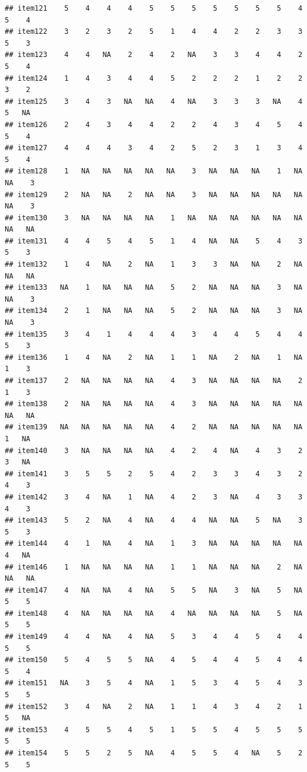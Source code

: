 \documentclass[
  man]{apa6}
\begin{document}
\begin{verbatim}
## item121    5    4    4    4    5    5    5    5    5    5    5    4    5    4
## item122    3    2    3    2    5    1    4    4    2    2    3    3    5    3
## item123    4    4   NA    2    4    2   NA    3    3    4    4    2    5    4
## item124    1    4    3    4    4    5    2    2    2    1    2    2    3    2
## item125    3    4    3   NA   NA    4   NA    3    3    3   NA    4    5   NA
## item126    2    4    3    4    4    2    2    4    3    4    5    4    5    4
## item127    4    4    4    3    4    2    5    2    3    1    3    4    5    4
## item128    1   NA   NA   NA   NA   NA    3   NA   NA   NA    1   NA   NA    3
## item129    2   NA   NA    2   NA   NA    3   NA   NA   NA   NA   NA   NA    3
## item130    3   NA   NA   NA   NA    1   NA   NA   NA   NA   NA   NA   NA   NA
## item131    4    4    5    4    5    1    4   NA   NA    5    4    3    5    3
## item132    1    4   NA    2   NA    1    3    3   NA   NA    2   NA   NA   NA
## item133   NA    1   NA   NA   NA    5    2   NA   NA   NA    3   NA   NA    3
## item134    2    1   NA   NA   NA    5    2   NA   NA   NA    3   NA   NA    3
## item135    3    4    1    4    4    4    3    4    4    5    4    4    5    3
## item136    1    4   NA    2   NA    1    1   NA    2   NA    1   NA    1    3
## item137    2   NA   NA   NA   NA    4    3   NA   NA   NA   NA    2    1    3
## item138    2   NA   NA   NA   NA    4    3   NA   NA   NA   NA   NA   NA   NA
## item139   NA   NA   NA   NA   NA    4    2   NA   NA   NA   NA   NA    1   NA
## item140    3   NA   NA   NA   NA    4    2    4   NA    4    3    2    3   NA
## item141    3    5    5    2    5    4    2    3    3    4    3    2    4    3
## item142    3    4   NA    1   NA    4    2    3   NA    4    3    3    4    3
## item143    5    2   NA    4   NA    4    4   NA   NA    5   NA    3    5    3
## item144    4    1   NA    4   NA    1    3   NA   NA   NA   NA   NA    4   NA
## item146    1   NA   NA   NA   NA    1    1   NA   NA   NA    2   NA   NA   NA
## item147    4   NA   NA    4   NA    5    5   NA    3   NA    5   NA    5    5
## item148    4   NA   NA   NA   NA    4   NA   NA   NA   NA    5   NA    5    5
## item149    4    4   NA    4   NA    5    3    4    4    5    4    4    5    5
## item150    5    4    5    5   NA    4    5    4    4    5    4    4    5    4
## item151   NA    3    5    4   NA    1    5    3    4    5    4    3    5    5
## item152    3    4   NA    2   NA    1    1    4    3    4    2    1    5   NA
## item153    4    5    5    4    5    1    5    5    4    5    5    5    5    5
## item154    5    5    2    5   NA    4    5    5    4   NA    5    2    5    5

\end{verbatim}
\end{document}
